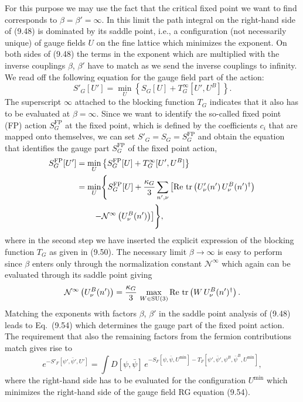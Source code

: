 For this purpose we may use the fact that the critical fixed point we want to
find corresponds to $\beta = \beta' = \infty$. In this limit the path integral
on the right-hand side of (9.48) is dominated by its saddle point, i.e., a
configuration (not necessarily unique) of gauge fields $U$ on the fine lattice
which minimizes the exponent. On both sides of (9.48) the terms in the
exponent which are multiplied with the inverse couplings $\beta$, $\beta'$
have to match as we send the inverse couplings to infinity. We read off the
following equation for the gauge field part of the action:
\begin{equation}
  S'_G[U'] = \min_U\left\{S_G[U] + T^\infty_G[U',U^B]\right\} .
\end{equation}
The superscript $\infty$ attached to the blocking function $T_G$ indicates
that it also has to be evaluated at $\beta = \infty$. Since we want to identify
the so-called fixed point (FP) action $S^{\mathrm{FP}}_G$ at the fixed point,
which is defined by the coefficients $c_i$ that are mapped onto themselves, we
can set $S'_G = S_G = S^{\mathrm{FP}}_G$ and obtain the equation that
identifies the gauge part $S^{\mathrm{FP}}_G$ of the fixed point action,
\begin{align}
  S^{\mathrm{FP}}_G[U']
  &= \min_U\left\{S^{\mathrm{FP}}_G[U] + T^\infty_G[U',U^B]\right\} \nonumber\\
  &= \min_U\Biggl\{S^{\mathrm{FP}}_G[U] + \frac{\kappa_G}{3}\sum_{n',\nu}
     \left[\mathrm{Re}\,\operatorname{tr}\left(U'_\nu(n')\,U^B_\nu(n')^\dagger\right)\right. \nonumber\\
  &\qquad \left.- \mathcal{N}^\infty\left(U^B_\nu(n')\right)\right]\Biggr\} ,
\end{align}
where in the second step we have inserted the explicit expression of the
blocking function $T_G$ as given in (9.50). The necessary limit $\beta \to
\infty$ is easy to perform since $\beta$ enters only through the normalization
constant $\mathcal{N}^\infty$ which again can be evaluated through its saddle
point giving
\begin{equation}
  \mathcal{N}^\infty\left(U^B_\nu(n')\right)
  = \frac{\kappa_G}{3}\,\max_{W\in\mathrm{SU}(3)}
    \mathrm{Re}\,\operatorname{tr}\left(W\,U^B_\nu(n')^\dagger\right) .
\end{equation}
Matching the exponents with factors $\beta$, $\beta'$ in the saddle point
analysis of (9.48) leads to Eq.~(9.54) which determines the gauge part of the
fixed point action. The requirement that also the remaining factors from the
fermion contributions match gives rise to
\begin{equation}
  e^{-S'_F[\psi',\bar\psi',U']} = \int D[\psi,\bar\psi]\,
    e^{-S_F[\psi,\bar\psi,U^{\min}] - T_F[\psi',\bar\psi',\psi^B,\bar\psi^B,U^{\min}]} ,
\end{equation}
where the right-hand side has to be evaluated for the configuration $U^{\min}$
which minimizes the right-hand side of the gauge field RG equation (9.54).

